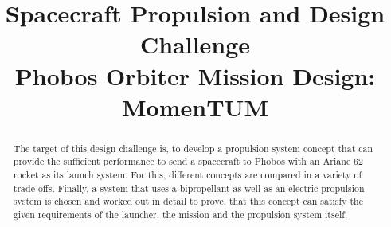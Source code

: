 \documentclass[conference]{IEEEtran}
\begin{document}
\title{Spacecraft Propulsion and Design Challenge \\ Phobos Orbiter Mission Design: MomenTUM}

\author{
\and
{}
\and
{}
\and
{}

}

\maketitle

\thispagestyle{plain}
\pagestyle{plain}

\begin{abstract}
The target of this design challenge is, to develop a propulsion system concept that can provide the sufficient performance to send a spacecraft to Phobos with an Ariane 62 rocket as its launch system. For this, different concepts are compared in a variety of trade-offs. Finally, a system that uses a bipropellant as well as an electric propulsion system is chosen and worked out in detail to prove, that this concept can satisfy the given requirements of the launcher, the mission and the propulsion system itself. 

\end{abstract}
\end{document}
